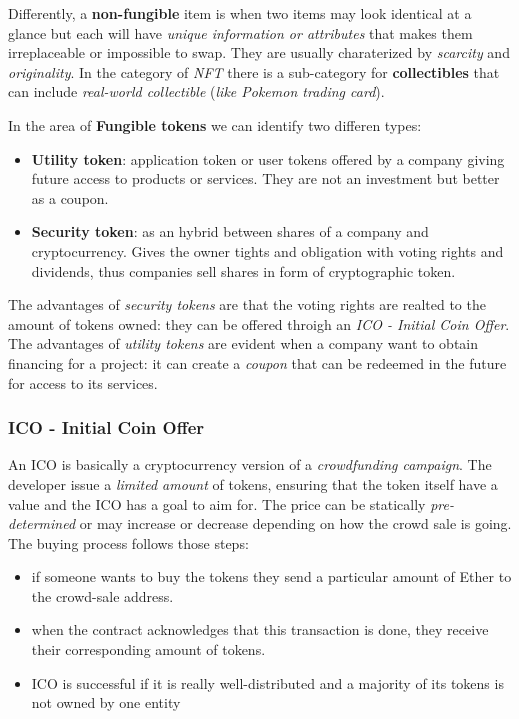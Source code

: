 \documentclass[10pt,a4paper]{report}
\begin{document}
Differently, a \textbf{non-fungible} item is when two items may look identical at a glance but each will have \textit{unique information or attributes} that makes them irreplaceable or impossible to swap. They are usually charaterized by \textit{scarcity} and \textit{originality}. In the category of \textit{NFT} there is a sub-category for \textbf{collectibles} that can include \textit{real-world collectible} (\textit{like Pokemon trading card}).

In the area of \textbf{Fungible tokens} we can identify two differen types:
\begin{itemize}
	\item 
	\textbf{Utility token}: application token or user tokens offered by a company giving future access to products or services. They are not an investment but better as a coupon.
	\item 
	\textbf{Security token}: as an hybrid between shares of a company and cryptocurrency. Gives the owner tights and obligation with voting rights and dividends, thus companies sell shares in form of cryptographic token.
\end{itemize}

The advantages of \textit{security tokens} are that the voting rights are realted to the amount of tokens owned: they can be offered throigh an \textit{ICO - Initial Coin Offer}.
The advantages of \textit{utility tokens} are evident when a company want to obtain financing for a project: it can create a \textit{coupon} that can be redeemed in the future for access to its services.
\subsubsection{ICO - Initial Coin Offer}\label{sec:ico---initial-coin-offer}
An ICO is basically a cryptocurrency version of a \textit{crowdfunding campaign}. The developer issue a \textit{limited amount} of tokens, ensuring that the token itself have a value and the ICO has a goal to aim for. The price can be statically \textit{pre-determined} or may increase or decrease depending on how the crowd sale is going. The buying process follows those steps:
\begin{itemize}
	\item 
	if someone wants to buy the tokens they send a particular amount of Ether to the crowd-sale address.
	\item 
	when the contract acknowledges that this transaction is done, they receive their corresponding amount of tokens.
	\item 
	ICO is successful if it is really well-distributed and a majority of its tokens is not owned by one entity
\end{itemize}
\end{document}
